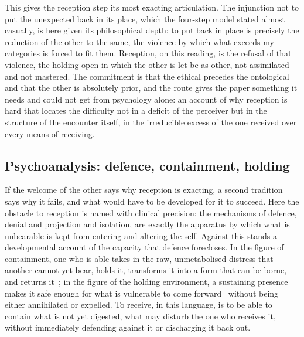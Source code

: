 This gives the reception step its most exacting articulation. The injunction not to put the unexpected back in its place, which the four-step model stated almost casually, is here given its philosophical depth: to put back in place is precisely the reduction of the other to the same, the violence by which what exceeds my categories is forced to fit them. Reception, on this reading, is the refusal of that violence, the holding-open in which the other is let be as other, not assimilated and not mastered. The commitment is that the ethical precedes the ontological and that the other is absolutely prior, and the route gives the paper something it needs and could not get from psychology alone: an account of why reception is hard that locates the difficulty not in a deficit of the perceiver but in the structure of the encounter itself, in the irreducible excess of the one received over every means of receiving.

\subsection{Psychoanalysis: defence, containment, holding}
\label{p22:sub:reception-psychoanalytic}

If the welcome of the other says why reception is exacting, a second tradition says why it fails, and what would have to be developed for it to succeed. Here the obstacle to reception is named with clinical precision: the mechanisms of defence, denial and projection and isolation, are exactly the apparatus by which what is unbearable is kept from entering and altering the self. Against this stands a developmental account of the capacity that defence forecloses. In the figure of containment, one who is able takes in the raw, unmetabolised distress that another cannot yet bear, holds it, transforms it into a form that can be borne, and returns it~\parencite{bion_learning}; in the figure of the holding environment, a sustaining presence makes it safe enough for what is vulnerable to come forward~\parencite{winnicott_maturational} without being either annihilated or expelled. To receive, in this language, is to be able to contain what is not yet digested, what may disturb the one who receives it, without immediately defending against it or discharging it back out.

